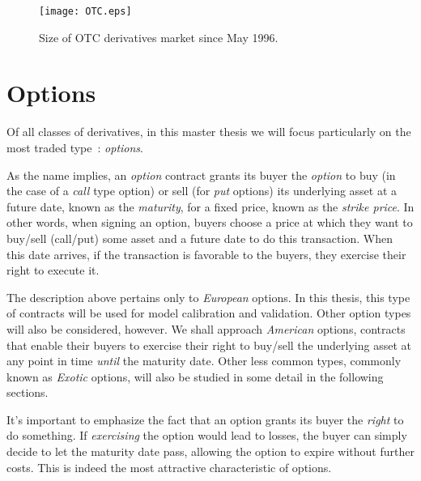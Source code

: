 \begin{figure}[!htb]
    \centering
      \texttt{[image: OTC.eps]}
      \caption{Size of OTC derivatives market since May 1996.}\label{fig:OTC}
    \end{figure}

\section{Options}
\label{section:options}
Of all classes of derivatives, in this master thesis we will focus particularly on the most traded type~\cite{Hull}: \emph{options}.

As the name implies, an \emph{option} contract grants its buyer the \emph{option} to buy (in the case of a \emph{call} type option) or sell (for \emph{put} options) its underlying asset at a future date, known as the \emph{maturity}, for a fixed price, known as the \emph{strike price}.
In other words, when signing an option, buyers choose a price at which they want to buy/sell (call/put) some asset and a future date to do this transaction. When this date arrives, if the transaction is favorable to the buyers, they exercise their right to execute it.

The description above pertains only to \emph{European} options. In this thesis, this type of contracts will be used for model calibration and validation. Other option types will also be considered, however. We shall approach \emph{American} options, contracts that enable their buyers to exercise their right to buy/sell the underlying asset at any point in time \emph{until} the maturity date. Other less common types, commonly known as \emph{Exotic} options, will also be studied in some detail in the following sections.


It's important to emphasize the fact that an option grants its buyer the \emph{right} to do something. If \emph{exercising} the option would lead to losses, the buyer can simply decide to let the maturity date pass, allowing the option to expire without further costs. This is indeed the most attractive characteristic of options.


\iffalse
